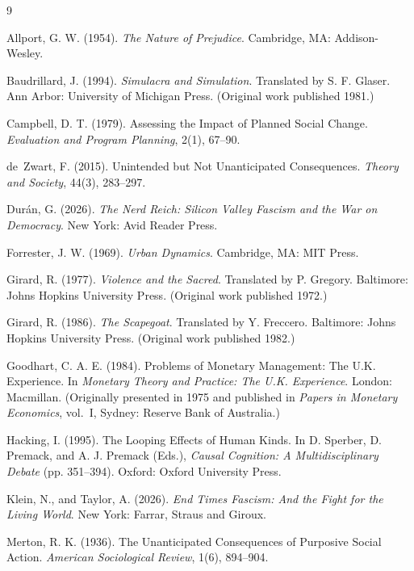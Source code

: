 \documentclass[12pt]{article}
\theoremstyle{remark}
\begin{document}
\begin{thebibliography}{9}

Allport, G. W. (1954).
\emph{The Nature of Prejudice}.
Cambridge, MA: Addison-Wesley.

Baudrillard, J. (1994).
\emph{Simulacra and Simulation}.
Translated by S. F. Glaser. Ann Arbor: University of Michigan Press.
(Original work published 1981.)

Campbell, D. T. (1979).
Assessing the Impact of Planned Social Change.
\emph{Evaluation and Program Planning}, 2(1), 67--90.

de~Zwart, F. (2015).
Unintended but Not Unanticipated Consequences.
\emph{Theory and Society}, 44(3), 283--297.

Dur\'an, G. (2026).
\emph{The Nerd Reich: Silicon Valley Fascism and the War on Democracy}.
New York: Avid Reader Press.

Forrester, J. W. (1969).
\emph{Urban Dynamics}.
Cambridge, MA: MIT Press.

Girard, R. (1977).
\emph{Violence and the Sacred}.
Translated by P. Gregory. Baltimore: Johns Hopkins University Press.
(Original work published 1972.)

Girard, R. (1986).
\emph{The Scapegoat}.
Translated by Y. Freccero. Baltimore: Johns Hopkins University Press.
(Original work published 1982.)

Goodhart, C. A. E. (1984).
Problems of Monetary Management: The U.K. Experience.
In \emph{Monetary Theory and Practice: The U.K. Experience}.
London: Macmillan.
(Originally presented in 1975 and published in \emph{Papers in Monetary Economics}, vol.~I,
Sydney: Reserve Bank of Australia.)

Hacking, I. (1995).
The Looping Effects of Human Kinds.
In D. Sperber, D. Premack, and A. J. Premack (Eds.),
\emph{Causal Cognition: A Multidisciplinary Debate} (pp. 351--394).
Oxford: Oxford University Press.

Klein, N., and Taylor, A. (2026).
\emph{End Times Fascism: And the Fight for the Living World}.
New York: Farrar, Straus and Giroux.

Merton, R. K. (1936).
The Unanticipated Consequences of Purposive Social Action.
\emph{American Sociological Review}, 1(6), 894--904.


\end{thebibliography}
\end{document}
